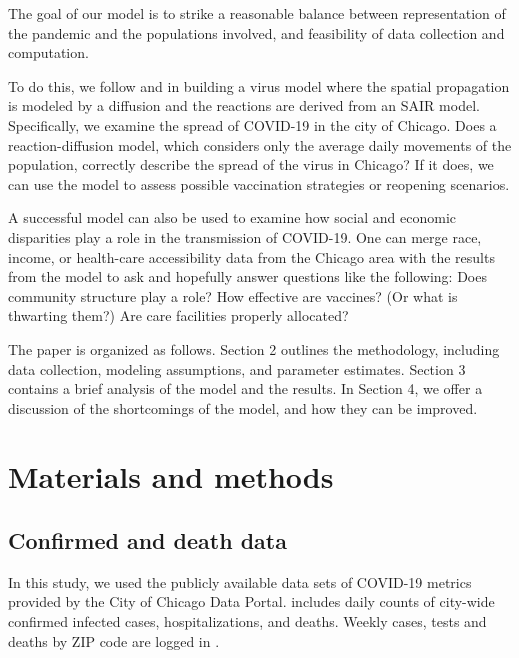 \documentclass[11pt]{article}
\begin{document}
	The goal of our model is to strike a reasonable balance between representation of the pandemic and the populations involved, and feasibility of data collection and computation.
	
	To do this, we follow \cite{Kevrekidis-2021} and \cite{Mammeri+2020+102+113} in building a virus model where the spatial propagation is modeled by a diffusion and the reactions are derived from an SAIR model.
	Specifically, we examine the spread of COVID-19 in the city of Chicago.
	Does a reaction-diffusion model, which considers only the average daily movements of the population, correctly describe the spread of the virus in Chicago?
	If it does, we can use the model to assess possible vaccination strategies or reopening scenarios.
	
	A successful model can also be used to examine how social and economic disparities play a role in the transmission of COVID-19.
	One can merge race, income, or health-care accessibility data from the Chicago area with the results from the model to ask and hopefully answer questions like the following:
	Does community structure play a role?
	How effective are vaccines? (Or what is thwarting them?)
	Are care facilities properly allocated?
	
	
	The paper is organized as follows.
	Section 2 outlines the methodology, including data collection, modeling assumptions, and parameter estimates.
	Section 3 contains a brief analysis of the model and the results.
	In Section 4, we offer a discussion of the shortcomings of the model, and how they can be improved.

\section{Materials and methods}
	\subsection{Confirmed and death data}
		In this study, we used the publicly available data sets of COVID-19 metrics provided by the City of Chicago Data Portal.
		\cite{Chicago-cases} includes daily counts of city-wide confirmed infected cases, hospitalizations, and deaths.
		Weekly cases, tests and deaths by ZIP code are logged in \cite{Chicago-zips}.
	
\end{document}
